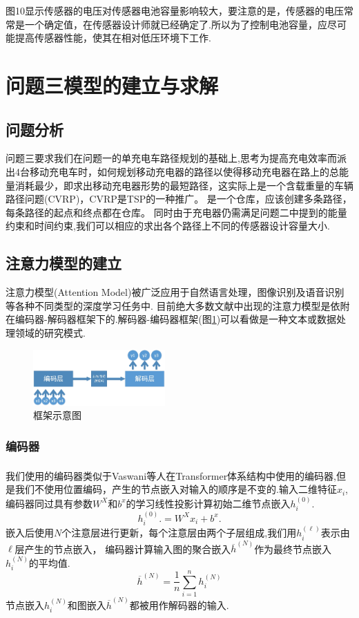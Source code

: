 \documentclass{whutmod}
\newcommand{\upcite}[1]{\textsuperscript{\textsuperscript{\cite{#1}}}}
\begin{document}
图10显示传感器的电压对传感器电池容量影响较大，要注意的是，传感器的电压常常是一个确定值，在传感器设计师就已经确定了.所以为了控制电池容量，应尽可能提高传感器性能，使其在相对低压环境下工作.


\section{问题三模型的建立与求解}
\subsection{问题分析}
问题三要求我们在问题一的单充电车路径规划的基础上,思考为提高充电效率而派出4台移动充电车时，如何规划移动充电器的路径以使得移动充电器在路上的总能量消耗最少，即求出移动充电器形势的最短路径，这实际上是一个含载重量的车辆路径问题(CVRP)，CVRP是TSP的一种推广。
是一个仓库，应该创建多条路径，每条路径的起点和终点都在仓库。
同时由于充电器仍需满足问题二中提到的能量约束和时间约束,我们可以相应的求出各个路径上不同的传感器设计容量大小.

\subsection{注意力模型的建立}
注意力模型(Attention Model)被广泛应用于自然语言处理，图像识别及语音识别等各种不同类型的深度学习任务中.
目前绝大多数文献中出现的注意力模型是依附在编码器-解码器框架下的.解码器-编码器框架(图\ref{kuangjia})可以看做是一种文本或数据处理领域的研究模式.
\begin{figure}[!h]
	\centering
	\includegraphics[width=0.45\textwidth]{framework.jpg}
	\caption{框架示意图}
	\label{kuangjia}
\end{figure}

\subsubsection{编码器}
我们使用的编码器类似于Vaswani\upcite{bib:four}等人在Transformer体系结构中使用的编码器,但是我们不使用位置编码，产生的节点嵌入对输入的顺序是不变的.输入二维特征$x_{i}$,编码器同过具有参数$W^{X}$和$b^{x}$的学习线性投影计算初始二维节点嵌入$h_{i}^{(0)}$.
\begin{equation}
h_{i}^{(0)}.=W^{X}x_{i}+b^{x}.
\end{equation}
 嵌入后使用$N$个注意层进行更新，每个注意层由两个子层组成,我们用$h_{i}^{(\ell )}$表示由$\ell$层产生的节点嵌入， 编码器计算输入图的聚合嵌入$\overline h^{(N)}$作为最终节点嵌入$h_{i}^{(N)}$的平均值.
\begin{equation}
\overline h^{(N)}=\frac{1}{n}\sum_{i=1}^{n}h_{i}^{(N)}
\end{equation}
节点嵌入$h_{i}^{(N)}$和图嵌入$\overline h^{(N)}$都被用作解码器的输入.
\end{document}
